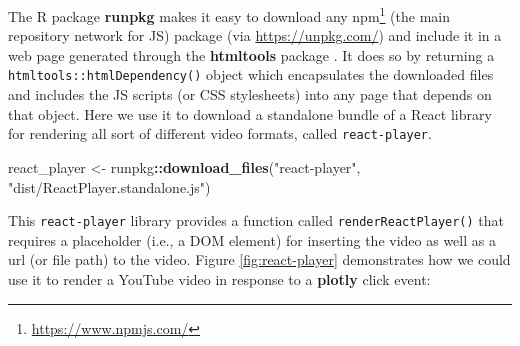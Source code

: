 \documentclass[
  12pt,
]{krantz}
\newenvironment{Shaded}{\begin{snugshade}}{\end{snugshade}}
\newcommand{\KeywordTok}[1]{\textcolor[rgb]{0.13,0.29,0.53}{\textbf{#1}}}
\newcommand{\NormalTok}[1]{#1}
\newcommand{\OperatorTok}[1]{\textcolor[rgb]{0.81,0.36,0.00}{\textbf{#1}}}
\newcommand{\StringTok}[1]{\textcolor[rgb]{0.31,0.60,0.02}{#1}}
\renewcommand{\href}[2]{#2\footnote{\url{#1}}}
\begin{document}
The R package \textbf{runpkg} makes it easy to download any \href{https://www.npmjs.com/}{npm} (the main repository network for JS) package (via \url{https://unpkg.com/}) and include it in a web page generated through the \textbf{htmltools} package \citep{runpkg}. It does so by returning a \texttt{htmltools::htmlDependency()} object which encapsulates the downloaded files and includes the JS scripts (or CSS stylesheets) into any page that depends on that object. Here we use it to download a standalone bundle of a React library for rendering all sort of different video formats, called \texttt{react-player}.

\begin{Shaded}
\begin{Highlighting}[]
\NormalTok{react_player <-}\StringTok{ }\NormalTok{runpkg}\OperatorTok{::}\KeywordTok{download_files}\NormalTok{(}\StringTok{"react-player"}\NormalTok{, }\StringTok{"dist/ReactPlayer.standalone.js"}\NormalTok{)}
\end{Highlighting}
\end{Shaded}

This \texttt{react-player} library provides a function called \texttt{renderReactPlayer()} that requires a placeholder (i.e., a DOM element) for inserting the video as well as a url (or file path) to the video. Figure \ref{fig:react-player} demonstrates how we could use it to render a YouTube video in response to a \textbf{plotly} click event:
\end{document}
